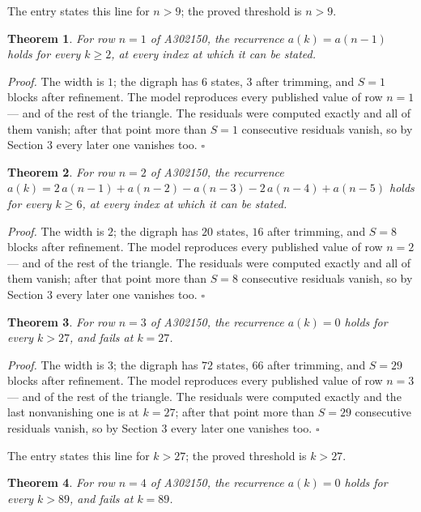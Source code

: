 \documentclass[11pt]{article}
\newtheorem{theorem}{Theorem}
\theoremstyle{definition}
\begin{document}
The entry states this line for $n > 9$; the proved threshold is $n > 9$.

\begin{theorem} For row $n = 1$ of A302150, the recurrence $a(k) = a(n-1)$ holds for every $k \ge 2$, at every index at which it can be stated.\end{theorem}

{\itshape Proof.} The width is $1$; the digraph has $6$ states, $3$ after trimming, and $S = 1$ blocks after refinement. The model reproduces every published value of row $n = 1$ --- and of the rest of the triangle. The residuals were computed exactly and all of them vanish; after that point more than $S = 1$ consecutive residuals vanish, so by Section 3 every later one vanishes too. $\square$

\begin{theorem} For row $n = 2$ of A302150, the recurrence $a(k) = 2\,a(n-1) + a(n-2) - a(n-3) - 2\,a(n-4) + a(n-5)$ holds for every $k \ge 6$, at every index at which it can be stated.\end{theorem}

{\itshape Proof.} The width is $2$; the digraph has $20$ states, $16$ after trimming, and $S = 8$ blocks after refinement. The model reproduces every published value of row $n = 2$ --- and of the rest of the triangle. The residuals were computed exactly and all of them vanish; after that point more than $S = 8$ consecutive residuals vanish, so by Section 3 every later one vanishes too. $\square$

\begin{theorem} For row $n = 3$ of A302150, the recurrence $a(k) = 0$ holds for every $k > 27$, and fails at $k = 27$.\end{theorem}

{\itshape Proof.} The width is $3$; the digraph has $72$ states, $66$ after trimming, and $S = 29$ blocks after refinement. The model reproduces every published value of row $n = 3$ --- and of the rest of the triangle. The residuals were computed exactly and the last nonvanishing one is at $k = 27$; after that point more than $S = 29$ consecutive residuals vanish, so by Section 3 every later one vanishes too. $\square$

The entry states this line for $k > 27$; the proved threshold is $k > 27$.

\begin{theorem} For row $n = 4$ of A302150, the recurrence $a(k) = 0$ holds for every $k > 89$, and fails at $k = 89$.\end{theorem}
\end{document}
